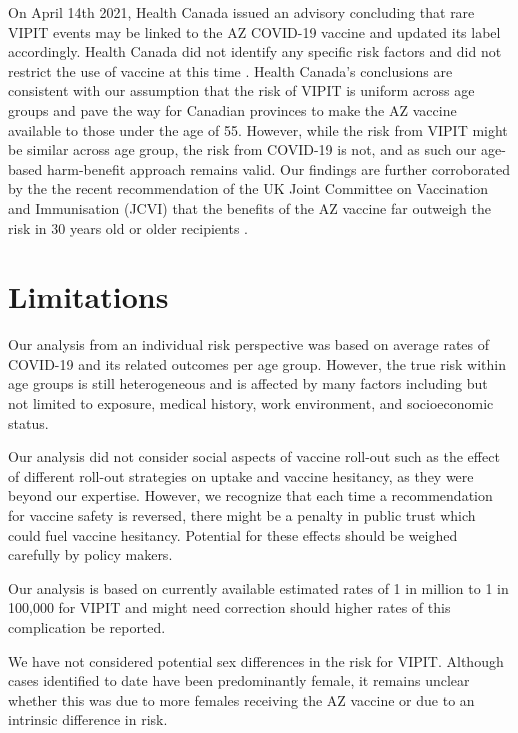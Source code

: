 \documentclass[]{interact}
\theoremstyle{plain}%
\theoremstyle{definition}
\theoremstyle{remark}
\begin{document}
On April 14th 2021, Health Canada issued an advisory concluding that
rare VIPIT events may be linked to the AZ COVID-19 vaccine and updated
its label accordingly. Health Canada did not identify any specific risk
factors and did not restrict the use of vaccine at this time
\citep{health_canada_health_2021}. Health Canada's conclusions are
consistent with our assumption that the risk of VIPIT is uniform across
age groups and pave the way for Canadian provinces to make the AZ
vaccine available to those under the age of 55. However, while the risk
from VIPIT might be similar across age group, the risk from COVID-19 is
not, and as such our age-based harm-benefit approach remains valid. Our
findings are further corroborated by the the recent recommendation of
the UK Joint Committee on Vaccination and Immunisation (JCVI) that the
benefits of the AZ vaccine far outweigh the risk in 30 years old or
older recipients \citep{jcvi_jcvi_2021}.

\hypertarget{limitations}{%
\section{Limitations}\label{limitations}}

Our analysis from an individual risk perspective was based on average
rates of COVID-19 and its related outcomes per age group. However, the
true risk within age groups is still heterogeneous and is affected by
many factors including but not limited to exposure, medical history,
work environment, and socioeconomic status.

Our analysis did not consider social aspects of vaccine roll-out such as
the effect of different roll-out strategies on uptake and vaccine
hesitancy, as they were beyond our expertise. However, we recognize that
each time a recommendation for vaccine safety is reversed, there might
be a penalty in public trust which could fuel vaccine hesitancy.
Potential for these effects should be weighed carefully by policy
makers.

Our analysis is based on currently available estimated rates of 1 in
million to 1 in 100,000 for VIPIT and might need correction should
higher rates of this complication be reported.

We have not considered potential sex differences in the risk for VIPIT.
Although cases identified to date have been predominantly female, it
remains unclear whether this was due to more females receiving the AZ
vaccine or due to an intrinsic difference in risk.
\end{document}
